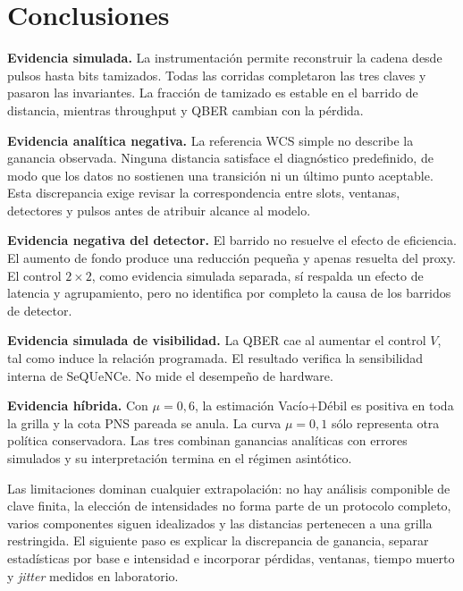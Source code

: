 \documentclass[12pt,a4paper]{article}
\begin{document}
\section{Conclusiones}

\textbf{Evidencia simulada.} La instrumentación permite reconstruir la cadena
desde pulsos hasta bits tamizados. Todas las corridas completaron las tres
claves y pasaron las invariantes. La fracción de tamizado es estable en el
barrido de distancia, mientras throughput y QBER cambian con la pérdida.

\textbf{Evidencia analítica negativa.} La referencia WCS simple no describe la
ganancia observada. Ninguna distancia satisface el diagnóstico predefinido, de
modo que los datos no sostienen una transición ni un último punto aceptable.
Esta discrepancia exige revisar la correspondencia entre slots, ventanas,
detectores y pulsos antes de atribuir alcance al modelo.

\textbf{Evidencia negativa del detector.} El barrido no resuelve el efecto de
eficiencia. El aumento de fondo produce una reducción pequeña y apenas resuelta
del proxy. El control \(2\times2\), como evidencia simulada separada, sí respalda
un efecto de latencia y agrupamiento, pero no identifica por completo la causa
de los barridos de detector.

\textbf{Evidencia simulada de visibilidad.} La QBER cae al aumentar el control
\(V\), tal como induce la relación programada. El resultado verifica la
sensibilidad interna de SeQUeNCe. No mide el desempeño de hardware.

\textbf{Evidencia híbrida.} Con \(\mu=0{,}6\), la estimación Vacío+Débil es
positiva en toda la grilla y la cota PNS pareada se anula. La curva
\(\mu=0{,}1\) sólo representa otra política conservadora. Las tres combinan
ganancias analíticas con errores simulados y su interpretación termina en el
régimen asintótico.

Las limitaciones dominan cualquier extrapolación: no hay análisis componible de
clave finita, la elección de intensidades no forma parte de un protocolo
completo, varios componentes siguen idealizados y las distancias pertenecen a
una grilla restringida. El siguiente paso es explicar la discrepancia de
ganancia, separar estadísticas por base e intensidad e incorporar pérdidas,
ventanas, tiempo muerto y \textit{jitter} medidos en laboratorio.



\end{document}
